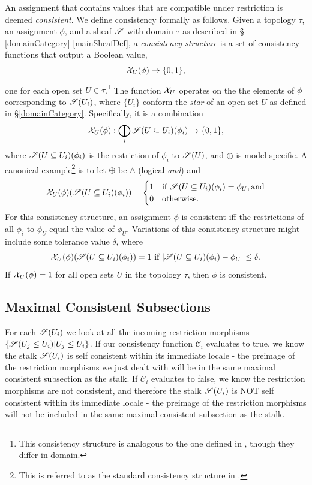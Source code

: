\documentclass{article}
\begin{document}
 An assignment that contains values that are
compatible under restriction is deemed \emph{consistent}.  We define
consistency formally as follows. Given a topology $\tau$, an assignment $\phi$,
and a sheaf $\mathscr{S}$ with domain $\tau$ as described in \S
\ref{domainCategory}-\ref{mainSheafDef}, a \emph{consistency structure} is a
set of consistency functions that output a Boolean value,
\begin{equation}
\mathcal{X}_U(\phi) \rightarrow \{0,1\},
\end{equation} 
one for each open set $U \in \tau$.\footnote{This consistency structure is
analogous to the one defined in \cite{praggastis2016maximal}, though they
differ in domain.} The function $\mathcal{X}_U$ operates on the the elements of $\phi$
corresponding to $\mathscr{S}(U_i)$, where $\{U_i\}$ conform the \emph{star} of an open
set $U$ as defined in \S\ref{domainCategory}. Specifically, it is a combination
\begin{equation} 
\mathcal{X}_U(\phi) : \bigoplus_{i} \mathscr{S}(U \subseteq U_i)(\phi_i) \rightarrow \{0,1\},
\end{equation}
where $\mathscr{S}(U \subseteq U_i)(\phi_i)$ is the restriction of $\phi_i$ to
$\mathscr{S}(U)$, and $\oplus$ is model-specific. A canonical example\footnote{ This is
referred to as the standard consistency structure in
\cite{praggastis2016maximal}.} is to let
$\oplus$ be $\wedge$ (logical \emph{and}) and 
\begin{equation} 
\mathcal{X}_U(\phi)( \mathscr{S}(U \subseteq U_i)(\phi_i) )  = 
\begin{cases}  
1 & \text{if } \mathscr{S}(U \subseteq U_i)(\phi_i) = \phi_U,  \text{and} \\
0 & \text{otherwise.}
\end{cases}
\end{equation}
For this consistency structure, an assignment $\phi$ is consistent iff the
restrictions of all $\phi_i$ to $\phi_U$ equal the value of  $\phi_U$.
Variations of this consistency structure might include some tolerance value
$\delta$, where 
\begin{equation}
\mathcal{X}_U(\phi)( \mathscr{S}(U \subseteq U_i)(\phi_i) ) = 1 \text{ if } | \mathscr{S}(U \subseteq
U_i)(\phi_i) - \phi_U  | \leq \delta.
\end{equation}
If $\mathcal{X}_U(\phi) = 1$ for all open sets $U$ in the topology $\tau$, then $\phi$ is consistent.

\subsection{Maximal Consistent Subsections}
For each $\mathscr{S}(U_i)$ we look at all the incoming restriction morphisms
$\{\mathscr{S}(U_j \leq U_i) | U_j \leq U_i\}$. If our consistency function
$\mathscr{C}_i$ evaluates to true, we know the stalk $\mathscr{S}(U_i)$ is self
consistent within its immediate locale - the preimage of the restriction
morphisms we just dealt with will be in the same maximal consistent subsection
as the stalk. If $\mathscr{C}_i$ evaluates to false, we know the restriction
morphisms are not consistent, and therefore the stalk $\mathscr{S}(U_i)$ is NOT self
consistent within its immediate locale - the preimage of the restriction
morphisms will not be included in the same maximal consistent subsection as the
stalk.
\end{document}
